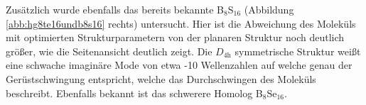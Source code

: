 Zusätzlich wurde ebenfalls das bereits bekannte B$_8$S$_{16}$\supercite{krebs1980b8s16} (Abbildung \ref{abb:hg8te16undb8s16} rechts) untersucht. Hier ist die Abweichung des Moleküls mit optimierten Strukturparametern von der planaren Struktur noch deutlich größer, wie die Seitenansicht deutlich zeigt. Die $D_{4\textrm{h}}$ symmetrische Struktur weißt eine schwache imaginäre Mode von etwa -10 Wellenzahlen auf welche genau der Gerüstschwingung entspricht, welche das Durchschwingen des Moleküls beschreibt. Ebenfalls bekannt ist das schwerere Homolog B$_8$Se$_{16}$.

